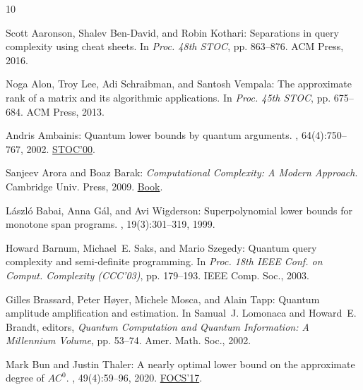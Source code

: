 \documentclass[11pt]{article}
\numberwithin{equation}{section}
\theoremstyle{definition}
\theoremstyle{plain}
\begin{document}
\tocrefpdfbookmark
\begin{thebibliography}{10}

{\sc Scott Aaronson, Shalev Ben-David, and Robin Kothari}: Separations in query
  complexity using cheat sheets.
\newblock In {\em Proc. 48th STOC}, pp. 863--876. ACM Press, 2016.

{\sc Noga Alon, Troy Lee, Adi Schraibman, and Santosh Vempala}: The approximate
  rank of a matrix and its algorithmic applications.
\newblock In {\em Proc. 45th STOC}, pp. 675--684. ACM Press, 2013.

{\sc Andris Ambainis}: Quantum lower bounds by quantum arguments.
, 64(4):750--767, 2002.
\newblock \prelim \href{https://doi.org/10.1145/335305.335394}{STOC'00}.

{\sc Sanjeev Arora and Boaz Barak}: {\em Computational Complexity: A Modern
  Approach}.
\newblock Cambridge Univ. Press, 2009.
\newblock \href{https://theory.cs.princeton.edu/complexity/book.pdf}{Book}.

{\sc L{\'a}szl{\'o} Babai, Anna G{\'a}l, and Avi Wigderson}: Superpolynomial
  lower bounds for monotone span programs.
, 19(3):301--319, 1999.
\newblock [\epfmtdoi{10.1007/s004930050058}]

{\sc Howard Barnum, Michael~E. Saks, and Mario Szegedy}: Quantum query
  complexity and semi-definite programming.
\newblock In {\em Proc. 18th IEEE Conf. on Comput. Complexity (CCC'03)}, pp.
  179--193. IEEE Comp. Soc., 2003.

{\sc Gilles Brassard, Peter H{\o}yer, Michele Mosca, and Alain Tapp}: Quantum
  amplitude amplification and estimation.
\newblock In {\sc Samual~J. Lomonaca and Howard~E. Brandt}, editors, {\em
  Quantum Computation and Quantum Information: A Millennium Volume}, pp.
  53--74. Amer. Math. Soc., 2002.

{\sc Mark Bun and Justin Thaler}: A nearly optimal lower bound on the
  approximate degree of {$AC^0$}.
, 49(4):59--96, 2020.
\newblock \prelim \href{https://doi.org/10.1109/FOCS.2017.10}{FOCS'17}.


\end{thebibliography}
\end{document}
